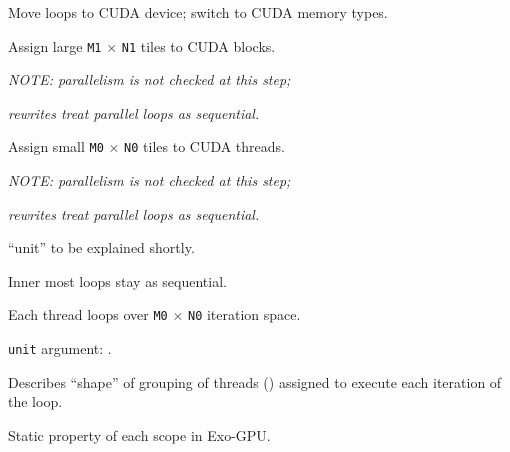 \newpage
{}

{\large

}

{\LARGE
Move loops to CUDA device; switch to CUDA memory types.

}

\newpage
{}

{\large

}

{\LARGE
Assign large \texttt{M1} $\times$ \texttt{N1} tiles to CUDA blocks.

\textit{NOTE: parallelism is not checked at this step;}

\textit{rewrites treat parallel loops as sequential.}

}



\newpage
{}

{\large

}

{\LARGE
Assign small \texttt{M0} $\times$ \texttt{N0} tiles to CUDA threads.

\textit{NOTE: parallelism is not checked at this step;}

\textit{rewrites treat parallel loops as sequential.}

}

\newpage
{}

{\large

}

{\LARGE
``unit'' to be explained shortly.

}

\newpage
{}

{\large

}

{\LARGE
Inner most loops stay as sequential.

Each thread loops over \texttt{M0} $\times$ \texttt{N0} iteration space.

}

\newpage
{}

{\large

}

{\LARGE
\texttt{unit} argument: .

Describes ``shape'' of grouping of threads () assigned to execute each iteration of the loop.

Static property of each scope in Exo-GPU.

}

